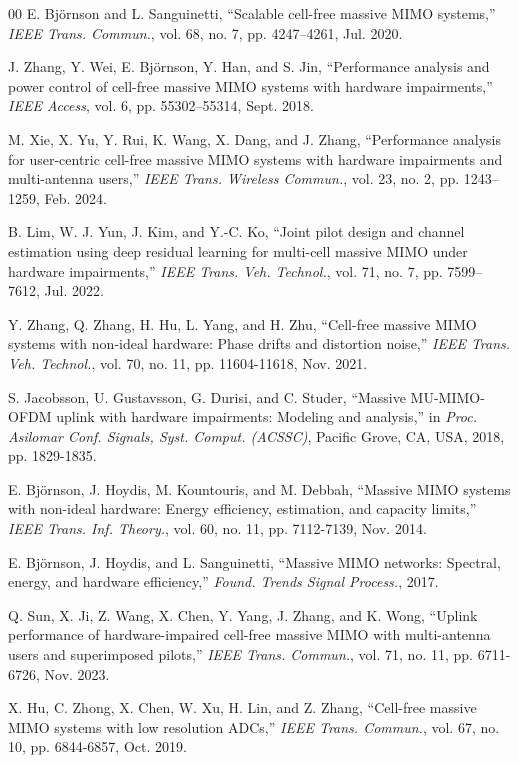 \begin{thebibliography}{00}
E. Bj{\"o}rnson and L. Sanguinetti, ``Scalable cell-free massive MIMO systems,'' \textit{IEEE Trans. Commun.}, vol. 68, no. 7, pp. 4247--4261, Jul. 2020.

J. Zhang, Y. Wei, E. Bj{\"o}rnson, Y. Han, and S. Jin, ``Performance analysis and power control of cell-free massive MIMO systems with hardware impairments,'' \textit{IEEE Access}, vol. 6, pp. 55302--55314, Sept. 2018.

M. Xie, X. Yu, Y. Rui, K. Wang, X. Dang, and J. Zhang, ``Performance analysis for user-centric cell-free massive MIMO systems with hardware impairments and multi-antenna users,'' \textit{IEEE Trans. Wireless Commun.}, vol. 23, no. 2, pp. 1243--1259, Feb. 2024.

B. Lim, W. J. Yun, J. Kim, and Y.-C. Ko, ``Joint pilot design and channel estimation using deep residual learning for multi-cell massive MIMO under hardware impairments,'' \textit{IEEE Trans. Veh. Technol.}, vol. 71, no. 7, pp. 7599--7612, Jul. 2022.

Y. Zhang, Q. Zhang, H. Hu, L. Yang, and H. Zhu, ``Cell-free massive MIMO systems with non-ideal hardware: Phase drifts and distortion noise,'' \textit{IEEE Trans. Veh. Technol.}, vol. 70, no. 11, pp. 11604-11618, Nov. 2021.

S. Jacobsson, U. Gustavsson, G. Durisi, and C. Studer, ``Massive MU-MIMO-OFDM uplink with hardware impairments: Modeling and analysis,'' in \textit{Proc. Asilomar Conf. Signals, Syst. Comput. (ACSSC)}, Pacific Grove, CA, USA, 2018, pp. 1829-1835.

E. Bj{\"o}rnson, J. Hoydis, M. Kountouris, and M. Debbah, ``Massive MIMO systems with non-ideal hardware: Energy efficiency, estimation, and capacity limits,'' \textit{IEEE Trans. Inf. Theory.}, vol. 60, no. 11, pp. 7112-7139, Nov. 2014.

E. Bj{\"o}rnson, J. Hoydis, and L. Sanguinetti, ``Massive MIMO networks: Spectral, energy, and hardware efficiency,'' \textit{Found. Trends Signal Process.}, 2017.

Q. Sun, X. Ji, Z. Wang, X. Chen, Y. Yang, J. Zhang, and K. Wong, ``Uplink performance of hardware-impaired cell-free massive MIMO with multi-antenna users and superimposed pilots,'' \textit{IEEE Trans. Commun.}, vol. 71, no. 11, pp. 6711-6726, Nov. 2023.

X. Hu, C. Zhong, X. Chen, W. Xu, H. Lin, and Z. Zhang, ``Cell-free massive MIMO systems with low resolution ADCs,'' \textit{IEEE Trans. Commun.}, vol. 67, no. 10, pp. 6844-6857, Oct. 2019.


\end{thebibliography}
